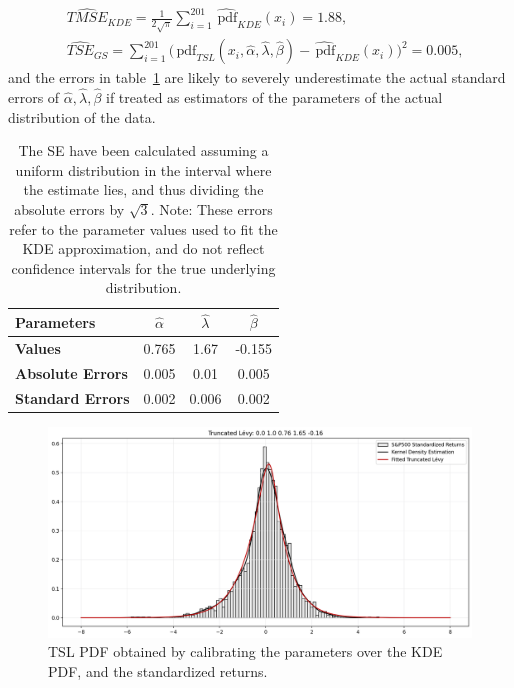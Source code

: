 \documentclass[11pt]{article}
\newcommand{\pdf}{\,\mathrm{pdf}}
\begin{document}
        \begin{equation}
            \begin{aligned}
                &\widehat{TMSE}_{KDE} = \frac{1}{2\sqrt{\pi}} \sum_{i=1}^{201}\widehat{\pdf}_{KDE}(x_i) = 1.88, \\
                &\widehat{TSE}_{GS} = \sum_{i=1}^{201}\bigg(\pdf_{TSL}(x_i, \hat{\alpha}, \hat{\lambda}, \hat{\beta})-\widehat{\pdf}_{KDE}(x_i)\bigg)^2 = 0.005,
            \end{aligned}
            \label{eq:errors}
        \end{equation}
        and the errors in table~\ref{tab:parameters} are likely to severely underestimate the actual standard errors of $\hat{\alpha}, \hat{\lambda}, \hat{\beta}$ if treated as estimators of the parameters of the actual distribution of the data.

        \begin{table}[h!]
            \centering
            \begin{tabular}{l|ccc}
                \textbf{Parameters} & $\hat \alpha$ & $\hat \lambda$ & $\hat \beta$  \\
                \hline
                 \textbf{Values} & 0.765 & 1.67 & -0.155\\
                \textbf{Absolute Errors} & 0.005 & 0.01 & 0.005 \\
                \textbf{Standard Errors} & 0.002 & 0.006 & 0.002 \\
            \end{tabular}
            \caption{The SE have been calculated assuming a uniform distribution in the interval where the estimate lies, and thus dividing the absolute errors by $\sqrt{3}$.
            Note: These errors refer to the parameter values used to fit the KDE approximation, and do not reflect confidence intervals for the true underlying distribution.}
            \label{tab:parameters}
        \end{table}

        \begin{figure}[h!]
            \centering
            \includegraphics[width=0.6 \linewidth]{img/fitted_tls}
            \caption{TSL PDF obtained by calibrating the parameters over the KDE PDF, and the standardized returns.}
            \label{fig:fitted_tls}
        \end{figure}
\end{document}
